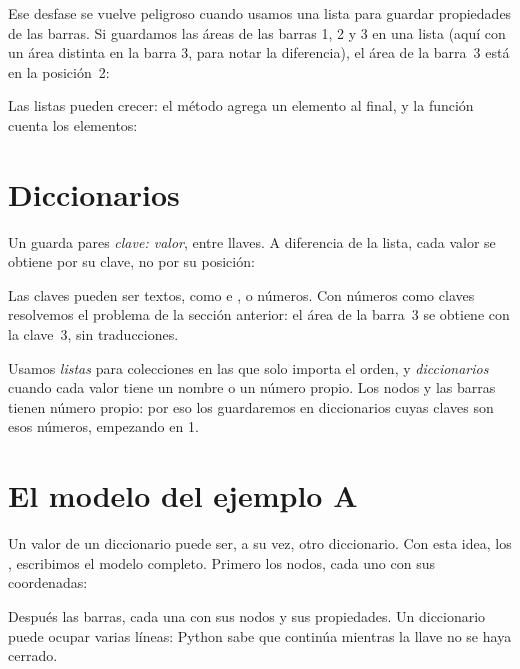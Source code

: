 Ese desfase se vuelve peligroso cuando usamos una lista para guardar
propiedades de las barras. Si guardamos las áreas de las barras 1, 2 y 3 en
una lista (aquí con un área distinta en la barra 3, para notar la
diferencia), el área de la barra~3 está en la posición~2:

Las listas pueden crecer: el método  agrega un elemento al final, y
la función  cuenta los elementos:

\section{Diccionarios}\label{sec:diccionarios}

Un  guarda pares \emph{clave: valor}, entre
llaves. A diferencia de la lista, cada valor se obtiene por su clave, no por
su posición:

Las claves pueden ser textos, como  e , o números. Con números
como claves resolvemos el problema de la sección anterior: el área de la
barra~3 se obtiene con la clave~3, sin traducciones.

\begin{recuerda}
Usamos \emph{listas} para colecciones en las que solo importa el orden, y
\emph{diccionarios} cuando cada valor tiene un nombre o un número propio. Los
nodos y las barras tienen número propio: por eso los guardaremos en
diccionarios cuyas claves son esos números, empezando en 1.
\end{recuerda}

\section{El modelo del ejemplo A}\label{sec:modelo_ejemplo_a}

Un valor de un diccionario puede ser, a su vez, otro diccionario. Con esta
idea, los , escribimos el
modelo completo. Primero los nodos, cada uno con sus coordenadas:

Después las barras, cada una con sus nodos y sus propiedades. Un diccionario
puede ocupar varias líneas: Python sabe que continúa mientras la llave no se
haya cerrado.

